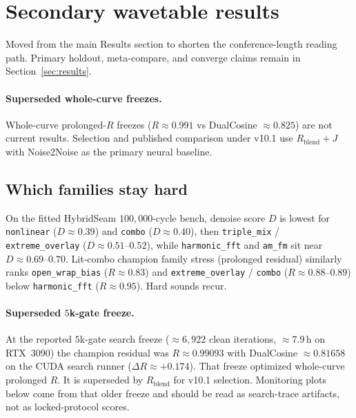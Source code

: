 \section{Secondary wavetable results}
\label{app:secondary-results}

Moved from the main Results section to shorten the conference-length reading path.
Primary holdout, meta-compare, and converge claims remain in Section~\ref{sec:results}.

\paragraph{Superseded whole-curve freezes.}
Whole-curve prolonged-$R$ freezes ($R{\approx}0.991$ vs DualCosine ${\approx}0.825$) are not current results.
Selection and published comparison under v10.1 use $R_{\mathrm{blend}}{+}J$ with Noise2Noise as the primary neural baseline.

\subsection{Which families stay hard}
\label{sec:family-hardness}
On the fitted HybridSeam $100{,}000$-cycle bench, denoise score $D$ is lowest for \texttt{nonlinear} ($D\approx 0.39$) and \texttt{combo} ($D\approx 0.40$), then \texttt{triple\_mix} / \texttt{extreme\_overlay} ($D\approx 0.51$--$0.52$), while \texttt{harmonic\_fft} and \texttt{am\_fm} sit near $D\approx 0.69$--$0.70$.
Lit-combo champion family stress (prolonged residual) similarly ranks \texttt{open\_wrap\_bias} ($R\approx 0.83$) and \texttt{extreme\_overlay} / \texttt{combo} ($R\approx 0.88$--$0.89$) below \texttt{harmonic\_fft} ($R\approx 0.95$).
Hard sounds recur.

\paragraph{Superseded $5$k-gate freeze.}
At the reported $5$k-gate search freeze ($\approx 6{,}922$ clean iterations, $\approx 7.9$\,h on RTX~3090) the champion residual was $R\approx 0.99093$ with DualCosine $\approx 0.81658$ on the CUDA search runner ($\Delta R\approx{+}0.174$).
That freeze optimized whole-curve prolonged $R$.
It is superseded by $R_{\mathrm{blend}}$ for v10.1 selection.
Monitoring plots below come from that older freeze and should be read as search-trace artifacts, not as locked-protocol scores.

